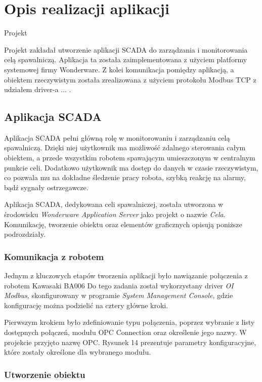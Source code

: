 \chapter{Opis realizacji aplikacji}
Projekt 


Projekt zakładał utworzenie aplikacji SCADA do zarządzania i monitorowania celą spawalniczą. Aplikacja ta została zaimplementowana z użyciem platformy systemowej firmy Wonderware. Z kolei komunikacja pomiędzy aplikacją, a obiektem rzeczywistym została zrealizowana z użyciem protokołu Modbus TCP z udziałem driver-a ... . 


\section{Aplikacja SCADA}

Aplikacja SCADA pełni główną rolę w monitorowaniu i zarządzaniu celą spawalniczą.  Dzięki niej użytkownik ma możliwość zdalnego sterowania całym obiektem, a przede wszystkim robotem spawającym umieszczonym w centralnym punkcie celi. Dodatkowo użytkownik ma dostęp do danych w czasie rzeczywistym, co pozwala mu na dokładne śledzenie pracy robota, szybką reakcję na alarmy, bądź sygnały ostrzegawcze. 

Aplikacja SCADA, dedykowana celi spawalniczej, została utworzona w środowisku \textit{Wonderware Application Server} jako projekt o nazwie \textit{Cela}. Komunikację, tworzenie obiektu oraz elementów graficznych opisują poniższe podrozdziały.


\subsection{Komunikacja z robotem}

Jednym z kluczowych etapów tworzenia aplikacji było nawiązanie połączenia z robotem Kawasaki BA006%
Do tego zadania został wykorzystany driver \textit{OI Modbus}, skonfigurowany w programie \textit{System Management Console}, gdzie konfigurację można podzielić na cztery główne kroki.

Pierwszym krokiem było zdefiniowanie typu połączenia, poprzez wybranie z listy dostępnych połączeń, modułu OPC Connection oraz określenie jego nazwy. W projekcie  przyjęto nazwę OPC. Rysunek 14 prezentuje parametry konfiguracyjne, które zostały określone dla wybranego modułu.


\subsection{Utworzenie obiektu}

